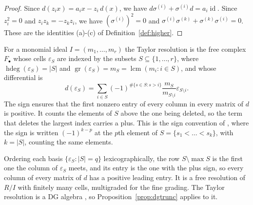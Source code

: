 \documentclass[12pt]{amsart}
\theoremstyle{plain}
\theoremstyle{definition}
\newcommand{\F}{ {F_\bullet} }
\newcommand{\id}{\operatorname{id}}
\newcommand{\lcm}{\operatorname{lcm}}
\newcommand{\hdeg}{\operatorname{hdeg}}
\newcommand{\gr}{\operatorname{gr}}
\newcommand{\eps}{\varepsilon}
\begin{document}
\begin{proof}
    Since $d(z_i x) = a_i x - z_i\,d(x)$, we have $d\sigma^{(i)} + \sigma^{(i)}d = a_i \id$. Since $z_i^2 = 0$ and $z_i z_k = -z_k z_i$, we have $(\sigma^{(i)})^2 = 0$ and $\sigma^{(i)}\sigma^{(k)} + \sigma^{(k)}\sigma^{(i)} = 0$. These are the identities (a)-(c) of Definition~\ref{def:higher}.
\end{proof}

For a monomial ideal $I = (m_1, \dots, m_r)$ the Taylor resolution is the free complex $\F$ whose cells $\eps_S$ are indexed by the subsets $S \subseteq \{1, \dots, r\}$, where $\hdeg(\eps_S) = |S|$ and $\gr(\eps_S) = m_S = \lcm(m_i : i \in S)$, and whose differential is
\[
    d(\eps_S) = \sum_{i \in S} (-1)^{\#\{s \in S : s > i\}} \frac{m_S}{m_{S \setminus i}} \eps_{S \setminus i} .
\]
The sign ensures that the first nonzero entry of every column in every matrix of $d$ is positive. It counts the elements of $S$ above the one being deleted, so the term that deletes the largest index carries a plus. This is the sign convention of \cite[Def.~3.1]{Sobieska}, where the sign is written $(-1)^{k-p}$ at the $p$th element of $S = \{s_1 < \dots < s_k\}$, with $k = |S|$, counting the same elements.

Ordering each basis $\{\eps_S : |S| = q\}$ lexicographically, the row $S \setminus \max S$ is the first one the column of $\eps_S$ meets, and its entry is the one with the plus sign, so every column of every matrix of $d$ has a positive leading entry. It is a free resolution of $R/I$ with finitely many cells, multigraded for the fine grading. The Taylor resolution is a DG algebra \cite{AvramovSixLectures}, so Proposition~\ref{prop:dgtrunc} applies to it.
\end{document}
